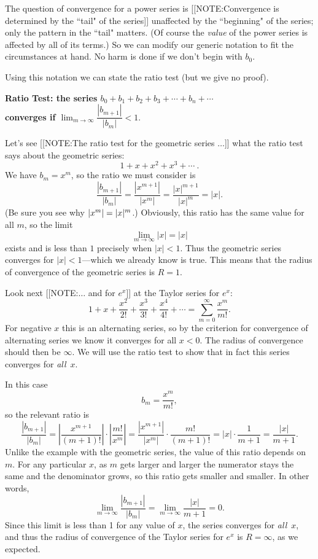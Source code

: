 The question of convergence for a power series is
[[NOTE:Convergence is determined by the ``tail" of the series]]
unaffected by the ``beginning" of the series; only the pattern in the
``tail" matters.  (Of course the {\em value\/} of the power series is
affected by all of its terms.)  So we can modify our generic notation
to fit the circumstances at hand.  No harm is done if we don't begin
with $b_0$.


Using this notation we can state the ratio test (but we give no proof).
\begin{observation}
\bf Ratio Test: the series \boldmath 
                        $b_0 + b_1 + b_2 + b_3 + \cdots + b_n + 
                        \cdots$\\
\bf converges if \boldmath ${\displaystyle 
                        \lim_{m \to \infty}\dfrac{|b_{m+1}|}{|b_m|} 
                        < 1.}$
\end{observation}
Let's see 
[[NOTE:The ratio test for the geometric series $\ldots$]]
what the ratio test says about the geometric series:
\[
1 + x + x^2 + x^3 + \cdots \ .
\]
We have $b_m = x^m$, so the ratio we must consider is
\[
\dfrac{|b_{m+1}|}{|b_m|} = \dfrac{|x^{m+1}|}{|x^m|} 
    = \dfrac{|x|^{m+1}}{|x|^m} = |x|.
\] 
(Be sure you see why $|x^m| = |x|^m\/$.)  Obviously, this ratio has
    the same value for all $m$, so the limit
\[
\lim_{m \to \infty} |x| = |x|
\]
exists and is less than $1$ precisely when $|x| < 1$.  Thus the
geometric series converges for $|x| < 1$---which we already know is
true.  This means that the radius of convergence of the geometric
series is $R=1$.


Look next 
[[NOTE:$\ldots$ and for $e^x$]]
at the Taylor series for $e^x$:
\[
1 + x + \dfrac{x^2}{2!} + \dfrac{x^3}{3!} + \dfrac{x^4}{4!} + \cdots 
    = \sum_{m=0}^{\infty} \dfrac{x^m}{m!}.
\]
For negative $x$ this is an alternating series, so by the criterion
for convergence of alternating series we know it converges for all $x
< 0$.  The radius of convergence should then be $\infty$.  We will use
the ratio test to show that in fact this series converges for {\em
  all\/}~$x$.

In this case
\[
b_m = \dfrac{x^m}{m!},
\]
so the relevant ratio is
\[
\dfrac{|b_{m+1}|}{|b_m|} = 
  \left|\dfrac{x^{m+1}}{(m+1)!}\right| \cdot \left|\dfrac{m!}{x^m}\right| 
  =  \dfrac{|x^{m+1}|}{|x^m|} \cdot \dfrac{m!}{(m+1)!}
  =  |x| \cdot \dfrac{1}{m+1} = \dfrac{|x|}{m+1}.
\]
Unlike the example with the geometric series, the value of this ratio
depends on $m$.  For any particular $x$, as $m$ gets larger and larger
the numerator stays the same and the denominator grows, so this ratio
gets smaller and smaller.  In other words,
\[
\lim_{m \to \infty} \dfrac{|b_{m+1}|}{|b_m|} 
    = \lim_{m \to \infty} \dfrac{|x|}{m+1} = 0.
\]
Since this limit is less than 1 for any value of $x$, the series
converges for {\em all\/}~$x$, and thus the radius of convergence of
the Taylor series for $e^x$ is $R= \infty$, as we expected.


